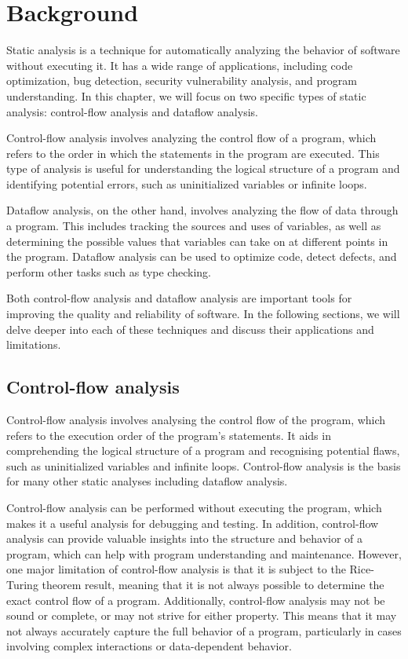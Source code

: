 \section{Background}
\label{sec:background}
Static analysis is a technique for automatically analyzing the behavior of software
without executing it. It has a wide range of applications, including code optimization,
bug detection, security vulnerability analysis, and program understanding.
In this chapter, we will focus on two specific types of static analysis:
control-flow analysis and dataflow analysis.

Control-flow analysis involves analyzing the control flow of a program,
which refers to the order in which the statements in the program are executed.
This type of analysis is useful for understanding the logical structure of a
program and identifying potential errors, such as uninitialized variables or
infinite loops.

Dataflow analysis, on the other hand, involves analyzing the flow of data through
a program. This includes tracking the sources and uses of variables, as well as
determining the possible values that variables can take on at different points in
the program. Dataflow analysis can be used to optimize code, detect defects, and
perform other tasks such as type checking.

Both control-flow analysis and dataflow analysis are important tools for improving
the quality and reliability of software. In the following sections, we will delve
deeper into each of these techniques and discuss their applications and limitations.



\subsection{Control-flow analysis}

Control-flow analysis involves analysing the control flow of the program, which refers
to the execution order of the program's statements. It aids in comprehending the logical
structure of a program and recognising potential flaws, such as uninitialized variables
and infinite loops.
Control-flow analysis is the basis for many other static analyses including dataflow analysis.


Control-flow analysis can be performed without executing the program, which makes
it a useful analysis for debugging and testing. In addition, control-flow analysis
can provide valuable insights into the structure and behavior of a program,
which can help with program understanding and maintenance.
However, one major limitation of control-flow analysis is that it is subject to the Rice-Turing theorem result,
meaning that it is not always possible to determine the exact control flow of a program.
Additionally, control-flow analysis may not be sound or complete, or may not
strive for either property. This means that it may not always accurately capture
the full behavior of a program, particularly in cases involving complex
interactions or data-dependent behavior.

